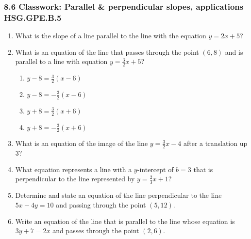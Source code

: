 

\fancyhead[LE]{\thepage}



\subsubsection*{8.6 Classwork: Parallel \& perpendicular slopes, applications \hfill HSG.GPE.B.5}
\begin{enumerate}[itemsep=2cm]
\item What is the slope of a line parallel to the line with the equation $y=2x+5$?

\item What is an equation of the line that passes through the point $(6,8)$ and is parallel to a line with equation $y=\frac{3}{2}x+5$?
  \begin{multicols}{2}
    \begin{enumerate}
      \item $y-8=\frac{3}{2}(x-6)$
      \item $y-8=-\frac{3}{2}(x-6)$ 
      \item $y+8=\frac{3}{2}(x+6)$
      \item $y+8=-\frac{3}{2}(x+6)$
    \end{enumerate}
  \end{multicols}

\item What is an equation of the image of the line $\displaystyle y=\frac{3}{2}x-4$ after a translation up 3?

\item What equation represents a line with a $y$-intercept of $b=3$ that is perpendicular to the line represented by $\displaystyle y=\frac{2}{3}x+1$?
    
\item Determine and state an equation of the line perpendicular to the line\\ $5x-4y=10$ and passing through the point $(5,12)$. \vspace{1cm}

\item Write an equation of the line that is parallel to the line whose equation is $3y+7=2x$ and passes through the point $(2,6)$. \vspace{1cm}


\end{enumerate}
